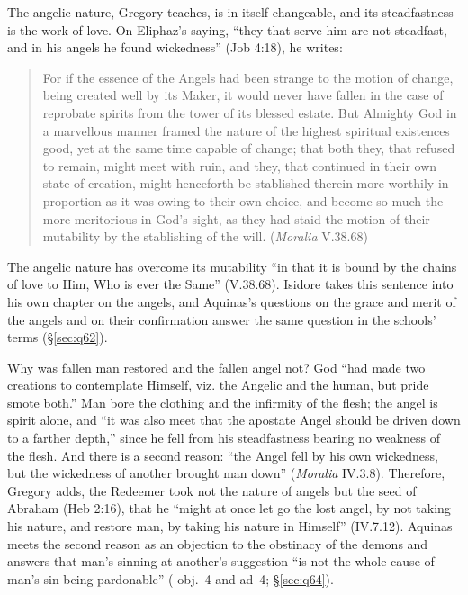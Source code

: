 The angelic nature, Gregory teaches, is in itself changeable, and its
steadfastness is the work of love. On Eliphaz's saying, ``they that serve him
are not steadfast, and in his angels he found wickedness'' (Job 4:18), he
writes:

\begin{quote}
For if the essence of the Angels had been strange to the motion of change,
being created well by its Maker, it would never have fallen in the case of
reprobate spirits from the tower of its blessed estate. But Almighty God in a
marvellous manner framed the nature of the highest spiritual existences good,
yet at the same time capable of change; that both they, that refused to
remain, might meet with ruin, and they, that continued in their own state of
creation, might henceforth be stablished therein more worthily in proportion
as it was owing to their own choice, and become so much the more meritorious
in God's sight, as they had staid the motion of their mutability by the
stablishing of the will. (\emph{Moralia} V.38.68)
\end{quote}

\noindent The angelic nature has overcome its mutability ``in that it is bound
by the chains of love to Him, Who is ever the Same'' (V.38.68). Isidore
takes this sentence into his own chapter on the angels, and Aquinas's
questions on the grace and merit of the angels and on their confirmation
answer the same question in the schools' terms (\S\ref{sec:q62}).

Why was fallen man restored and the fallen angel not? God ``had made two
creations to contemplate Himself, viz. the Angelic and the human, but pride
smote both.'' Man bore the clothing and the infirmity of the flesh; the angel
is spirit alone, and ``it was also meet that the apostate Angel should be
driven down to a farther depth,'' since he fell from his steadfastness
bearing no weakness of the flesh. And there is a second reason: ``the Angel fell by his own
wickedness, but the wickedness of another brought man down''
(\emph{Moralia} IV.3.8). Therefore, Gregory adds, the Redeemer took not the
nature of angels but the seed of Abraham (Heb 2:16), that he ``might at once
let go the lost angel, by not taking his nature, and restore man, by taking
his nature in Himself'' (IV.7.12). Aquinas meets the second reason as an
objection to the obstinacy of the demons and answers that man's sinning at
another's suggestion ``is not the whole cause of man's sin being pardonable''
( obj.~4 and ad~4; \S\ref{sec:q64}).


